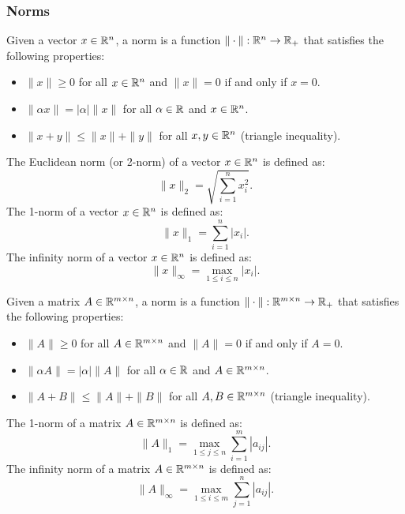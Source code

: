 \subsubsection{Norms}
\begin{definition}
    Given a vector $x \in \mathbb{R}^n$, a norm is a function $\| \cdot \|: \mathbb{R}^n \rightarrow \mathbb{R}_+$ that satisfies the following properties:
    \begin{itemize}
        \item $\| x \| \geq 0$ for all $x \in \mathbb{R}^n$ and $\| x \| = 0$ if and only if $x = 0$.
        \item $\| \alpha x \| = |\alpha| \| x \|$ for all $\alpha \in \mathbb{R}$ and $x \in \mathbb{R}^n$.
        \item $\| x + y \| \leq \| x \| + \| y \|$ for all $x, y \in \mathbb{R}^n$ (triangle inequality).
    \end{itemize}
\end{definition}
\begin{example}
    The Euclidean norm (or 2-norm) of a vector $x \in \mathbb{R}^n$ is defined as:  
    \begin{equation}
    \| x \|_2 = \sqrt{\sum_{i=1}^{n} x_i^2}.
    \end{equation}
    The 1-norm of a vector $x \in \mathbb{R}^n$ is defined as:
    \begin{equation}
    \| x \|_1 = \sum_{i=1}^{n} |x_i|.
    \end{equation}
    The infinity norm of a vector $x \in \mathbb{R}^n$ is defined as:
    \begin{equation}
    \| x \|_\infty = \max_{1 \leq i \leq n} |x_i|.
    \end{equation}
\end{example}
\begin{definition}
    Given a matrix $A \in \mathbb{R}^{m \times n}$, a norm is a function $\| \cdot \|: \mathbb{R}^{m \times n} \rightarrow \mathbb{R}_+$ that satisfies the following properties:
    \begin{itemize}
        \item $\| A \| \geq 0$ for all $A \in \mathbb{R}^{m \times n}$ and $\| A \| = 0$ if and only if $A = 0$.
        \item $\| \alpha A \| = |\alpha| \| A \|$ for all $\alpha \in \mathbb{R}$ and $A \in \mathbb{R}^{m \times n}$.
        \item $\| A + B \| \leq \| A \| + \| B \|$ for all $A, B \in \mathbb{R}^{m \times n}$ (triangle inequality).
    \end{itemize}
\end{definition}
\begin{example}
    The 1-norm of a matrix $A \in \mathbb{R}^{m \times n}$ is defined as:
    \begin{equation}\label{1-norm}
    \| A \|_1 = \max_{1 \leq j \leq n} \sum_{i=1}^{m} |a_{ij}|.
    \end{equation}
    The infinity norm of a matrix $A \in \mathbb{R}^{m \times n}$ is defined as:
    \begin{equation}\label{infty-norm}
    \| A \|_\infty = \max_{1 \leq i \leq m} \sum_{j=1}^{n} |a_{ij}|.
    \end{equation}
\end{example}

